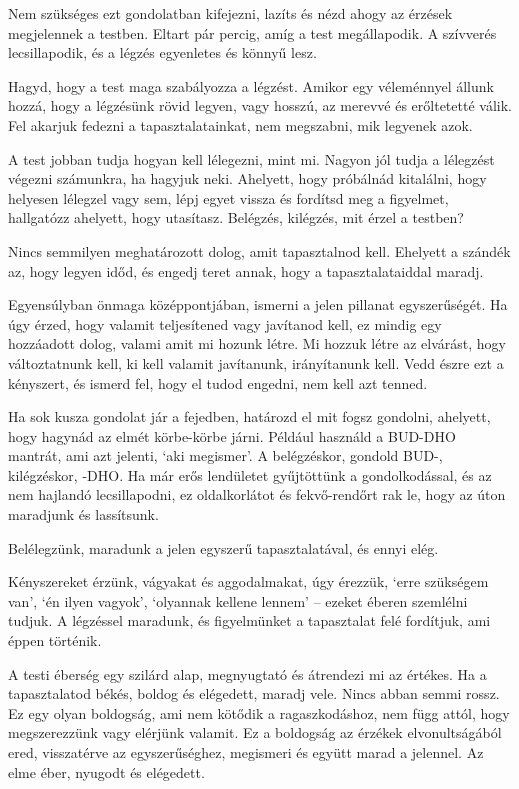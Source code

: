 Nem szükséges ezt gondolatban kifejezni, lazíts és nézd ahogy az érzések
megjelennek a testben. Eltart pár percig, amíg a test megállapodik. A
szívverés lecsillapodik, és a légzés egyenletes és könnyű lesz.

Hagyd, hogy a test maga szabályozza a légzést. Amikor egy véleménnyel
állunk hozzá, hogy a légzésünk rövid legyen, vagy hosszú, az merevvé és
erőltetetté válik. Fel akarjuk fedezni a tapasztalatainkat, nem
megszabni, mik legyenek azok.

A test jobban tudja hogyan kell lélegezni, mint mi. Nagyon jól tudja a
lélegzést végezni számunkra, ha hagyjuk neki. Ahelyett, hogy próbálnád
kitalálni, hogy helyesen lélegzel vagy sem, lépj egyet vissza és
fordítsd meg a figyelmet, hallgatózz ahelyett, hogy utasítasz. Belégzés,
kilégzés, mit érzel a testben?

Nincs semmilyen meghatározott dolog, amit tapasztalnod kell. Ehelyett a
szándék az, hogy legyen időd, és engedj teret annak, hogy a
tapasztalataiddal maradj.

Egyensúlyban önmaga középpontjában, ismerni a jelen pillanat
egyszerűségét. Ha úgy érzed, hogy valamit teljesítened vagy javítanod
kell, ez mindig egy hozzáadott dolog, valami amit mi hozunk létre. Mi
hozzuk létre az elvárást, hogy változtatnunk kell, ki kell valamit
javítanunk, irányítanunk kell. Vedd észre ezt a kényszert, és ismerd
fel, hogy el tudod engedni, nem kell azt tenned.

Ha sok kusza gondolat jár a fejedben, határozd el mit fogsz gondolni,
ahelyett, hogy hagynád az elmét körbe-körbe járni. Például használd a
BUD-DHO mantrát, ami azt jelenti, `aki megismer'. A belégzéskor, gondold
BUD-, kilégzéskor, -DHO. Ha már erős lendületet gyűjtöttünk a
gondolkodással, és az nem hajlandó lecsillapodni, ez oldalkorlátot és
fekvő-rendőrt rak le, hogy az úton maradjunk és lassítsunk.

Belélegzünk, maradunk a jelen egyszerű tapasztalatával, és ennyi elég.

Kényszereket érzünk, vágyakat és aggodalmakat, úgy érezzük, `erre
szükségem van', `én ilyen vagyok', `olyannak kellene lennem' -- ezeket
éberen szemlélni tudjuk. A légzéssel maradunk, és figyelmünket a
tapasztalat felé fordítjuk, ami éppen történik.

A testi éberség egy szilárd alap, megnyugtató és átrendezi mi az
értékes. Ha a tapasztalatod békés, boldog és elégedett, maradj vele.
Nincs abban semmi rossz. Ez egy olyan boldogság, ami nem kötődik a
ragaszkodáshoz, nem függ attól, hogy megszerezzünk vagy elérjünk
valamit. Ez a boldogság az érzékek elvonultságából ered, visszatérve az
egyszerűséghez, megismeri és együtt marad a jelennel. Az elme éber,
nyugodt és elégedett.

